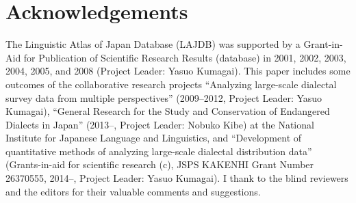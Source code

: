 \documentclass[output=paper]{LSP/langsci}
\begin{document}
\section*{Acknowledgements}
The Linguistic Atlas of Japan Database (LAJDB) was supported by a Grant-in-Aid for Publication of Scientific Research Results (database) in 2001, 2002, 2003, 2004, 2005, and 2008 (Project Leader: Yasuo Kumagai). This paper includes some outcomes of the collaborative research projects “Analyzing large-scale dialectal survey data from multiple perspectives” (2009–2012, Project Leader: Yasuo Kumagai), “General Research for the Study and Conservation of Endangered Dialects in Japan” (2013–, Project Leader: Nobuko Kibe) at the National Institute for Japanese Language and Linguistics, and “Development of quantitative methods of analyzing large-scale dialectal distribution data” (Grants-in-aid for scientific research (c), JSPS KAKENHI Grant Number 26370555, 2014–, Project Leader: Yasuo Kumagai). I thank to the blind reviewers and the editors for their valuable comments and suggestions.

\printbibliography[heading=subbibliography,notkeyword=this]
\end{document}
